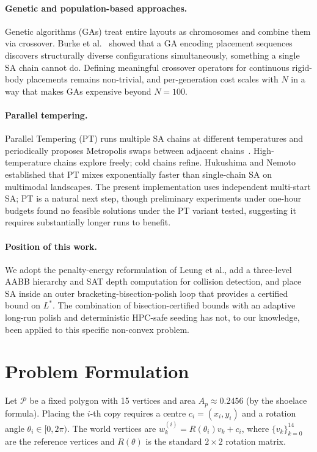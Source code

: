 \documentclass[10pt,twocolumn]{article}
\begin{document}
\paragraph{Genetic and population-based approaches.}
Genetic algorithms (GAs) treat entire layouts as chromosomes and
combine them via crossover. Burke et al.~\cite{burke2006} showed that a
GA encoding placement sequences discovers structurally diverse
configurations simultaneously, something a single SA chain cannot do.
Defining meaningful crossover operators for continuous rigid-body
placements remains non-trivial, and per-generation cost scales with $N$
in a way that makes GAs expensive beyond $N = 100$.

\paragraph{Parallel tempering.}
Parallel Tempering (PT) runs multiple SA chains at different temperatures
and periodically proposes Metropolis swaps between adjacent
chains~\cite{hukushima1996,earl2005}. High-temperature chains explore
freely; cold chains refine. Hukushima and Nemoto established that PT
mixes exponentially faster than single-chain SA on multimodal
landscapes. The present implementation uses independent multi-start SA;
PT is a natural next step, though preliminary experiments under
one-hour budgets found no feasible solutions under the PT variant
tested, suggesting it requires substantially longer runs to benefit.

\paragraph{Position of this work.}
We adopt the penalty-energy reformulation of Leung et al., add a
three-level AABB hierarchy and SAT depth computation for collision
detection, and place SA inside an outer bracketing-bisection-polish
loop that provides a certified bound on $L^*$. The combination of
bisection-certified bounds with an adaptive long-run polish and
deterministic HPC-safe seeding has not, to our knowledge, been applied
to this specific non-convex problem.

\section{Problem Formulation}
\label{sec:formulation}

Let $\mathcal{P}$ be a fixed polygon with 15 vertices and area
$A_p \approx 0.2456$ (by the shoelace formula). Placing the $i$-th copy
requires a centre $c_i = (x_i, y_i)$ and a rotation angle $\theta_i
\in [0, 2\pi)$. The world vertices are $w_k^{(i)} = R(\theta_i)v_k +
c_i$, where $\{v_k\}_{k=0}^{14}$ are the reference vertices and
$R(\theta)$ is the standard $2 \times 2$ rotation matrix.
\end{document}
